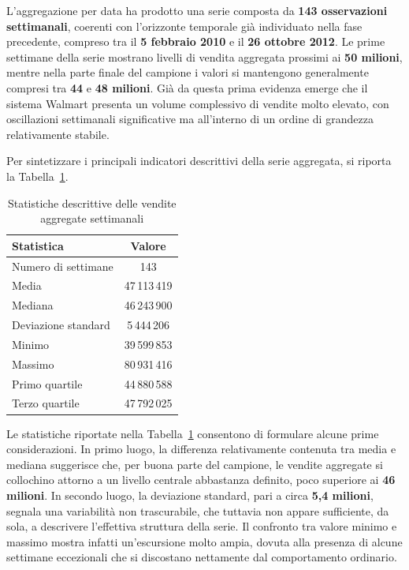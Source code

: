 \documentclass[a4paper,12pt]{article}
\begin{document}
L’aggregazione per data ha prodotto una serie composta da \textbf{143 osservazioni settimanali}, coerenti con l’orizzonte temporale già individuato nella fase precedente, compreso tra il \textbf{5 febbraio 2010} e il \textbf{26 ottobre 2012}. Le prime settimane della serie mostrano livelli di vendita aggregata prossimi ai \textbf{50 milioni}, mentre nella parte finale del campione i valori si mantengono generalmente compresi tra \textbf{44} e \textbf{48 milioni}. Già da questa prima evidenza emerge che il sistema Walmart presenta un volume complessivo di vendite molto elevato, con oscillazioni settimanali significative ma all’interno di un ordine di grandezza relativamente stabile.

Per sintetizzare i principali indicatori descrittivi della serie aggregata, si riporta la Tabella~\ref{tab:vendite_aggregate_descrittive}.

\begin{table}[H]
\centering
\caption{Statistiche descrittive delle vendite aggregate settimanali}
\label{tab:vendite_aggregate_descrittive}
\begin{tabular}{lc}
\toprule
\textbf{Statistica} & \textbf{Valore} \\
\midrule
Numero di settimane & 143 \\
Media & 47\,113\,419 \\
Mediana & 46\,243\,900 \\
Deviazione standard & 5\,444\,206 \\
Minimo & 39\,599\,853 \\
Massimo & 80\,931\,416 \\
Primo quartile & 44\,880\,588 \\
Terzo quartile & 47\,792\,025 \\
\bottomrule
\end{tabular}
\end{table}

Le statistiche riportate nella Tabella~\ref{tab:vendite_aggregate_descrittive} consentono di formulare alcune prime considerazioni. In primo luogo, la differenza relativamente contenuta tra media e mediana suggerisce che, per buona parte del campione, le vendite aggregate si collochino attorno a un livello centrale abbastanza definito, poco superiore ai \textbf{46 milioni}. In secondo luogo, la deviazione standard, pari a circa \textbf{5,4 milioni}, segnala una variabilità non trascurabile, che tuttavia non appare sufficiente, da sola, a descrivere l’effettiva struttura della serie. Il confronto tra valore minimo e massimo mostra infatti un’escursione molto ampia, dovuta alla presenza di alcune settimane eccezionali che si discostano nettamente dal comportamento ordinario.
\end{document}
